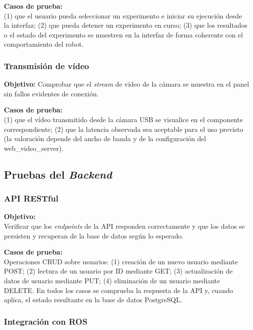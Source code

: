 \documentclass[12pt]{article}
\numberwithin{figure}{section}
\numberwithin{table}{section}
\def\code#1{#1}%
\newcommand{\code}[1]{\textcolor{codeblue}{\url{#1}}}
\begin{document}
\textbf{Casos de prueba:}\\ (1) que el usuario pueda seleccionar un experimento e iniciar su ejecución desde la interfaz; (2) que pueda detener un experimento en curso; (3) que los resultados o el estado del experimento se muestren en la interfaz de forma coherente con el comportamiento del robot.

\subsubsection{Transmisión de vídeo}

\textbf{Objetivo:} Comprobar que el \textit{stream} de vídeo de la cámara se muestra en el panel sin fallos evidentes de conexión.

\textbf{Casos de prueba:}\\ (1) que el vídeo transmitido desde la cámara USB se visualice en el componente correspondiente; (2) que la latencia observada sea aceptable para el uso previsto (la valoración depende del ancho de banda y de la configuración del \code{web\_video\_server}).


\subsection{Pruebas del \textit{Backend}}


\subsubsection{API RESTful}

\textbf{Objetivo:}\\
Verificar que los \textit{endpoints} de la API responden correctamente y que los datos se persisten y recuperan de la base de datos según lo esperado.

\textbf{Casos de prueba:}\\
Operaciones CRUD sobre usuarios: (1) creación de un nuevo usuario mediante \code{POST}; (2) lectura de un usuario por ID mediante \code{GET}; (3) actualización de datos de usuario mediante \code{PUT}; (4) eliminación de un usuario mediante \code{DELETE}. En todos los casos se comprueba la respuesta de la API y, cuando aplica, el estado resultante en la base de datos PostgreSQL.


\subsubsection{Integración con ROS}
\end{document}
